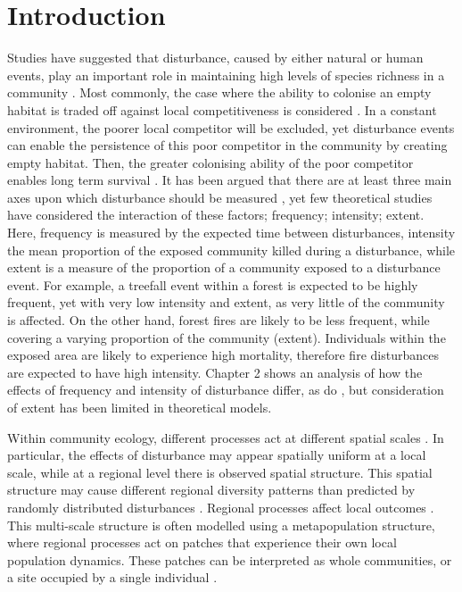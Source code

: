 \section{Introduction}
Studies have suggested that disturbance, caused by either natural or human events, play an important role in maintaining high levels of species richness in a community \cite{connell1978diversity,huston1979general,sousa1984role,schoener1974resource}. Most commonly, the case where the ability to colonise an empty habitat is traded off against local competitiveness is considered \citep[e.g.][]{tilman1994competition, cadotte2006testing}. In a constant environment, the poorer local competitor will be excluded, yet disturbance events can enable the persistence of this poor competitor in the community by creating empty habitat. Then, the greater colonising ability of the poor competitor enables long term survival \citep{sousa1984role,denslow1987tropical,connell1978diversity,grime1973competitive,huston1979general}. It has been argued that there are at least three main axes upon which disturbance should be measured \cite{malanson1984intensity,miller1982community,sousa1984role}, yet few theoretical studies have considered the interaction of these factors; frequency; intensity; extent. Here, frequency is measured by the expected time between disturbances, intensity the mean proportion of the exposed community killed during a disturbance, while extent is a measure of the proportion of a community exposed to a disturbance event. For example, a treefall event within a forest is expected to be highly frequent, yet with very low intensity and extent, as very little of the community is affected. On the other hand, forest fires are likely to be less frequent, while covering a varying proportion of the community (extent). Individuals within the exposed area are likely to experience high mortality, therefore fire disturbances are expected to have high intensity. Chapter 2 shows an analysis of how the effects of frequency and intensity of disturbance differ, as do \cite{miller2011frequency}, but consideration of extent has been limited in theoretical models.

Within community ecology, different processes act at different spatial scales \citep{levin1992problem}. In particular, the effects of disturbance may appear spatially uniform at a local scale, while at a regional level there is observed spatial structure. This spatial structure may cause different regional diversity patterns than predicted by randomly distributed disturbances \cite{vuilleumier2007patch}. Regional processes affect local outcomes \cite{holt1993ecology}. This multi-scale structure is often modelled using a metapopulation structure, where regional processes act on patches that experience their own local population dynamics. These patches can be interpreted as whole communities, or a site occupied by a single individual \cite{tilman1994competition,calcagno2006coexistence}.

